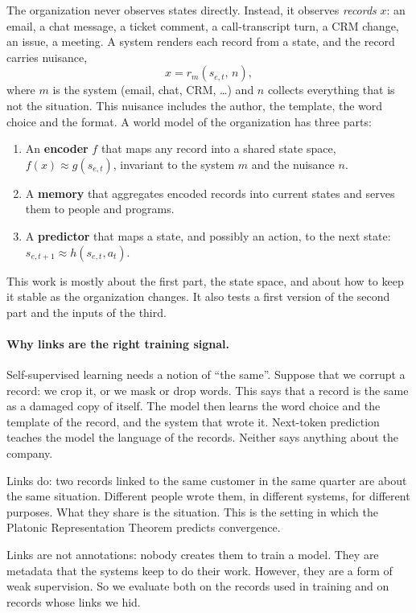 \documentclass[11pt]{article}
\begin{document}
The organization never observes states directly. Instead, it observes \emph{records} $x$: an email, a chat message, a ticket comment, a call-transcript turn, a CRM change, an issue, a meeting. A system renders each record from a state, and the record carries nuisance,
\begin{equation}
x = r_m\!\left(s_{e,t},\, n\right),
\end{equation}
where $m$ is the system (email, chat, CRM, \dots) and $n$ collects everything that is not the situation. This nuisance includes the author, the template, the word choice and the format. A world model of the organization has three parts:
\begin{enumerate}[label=(\roman*)]
\item An \textbf{encoder} $f$ that maps any record into a shared state space, $f(x) \approx g(s_{e,t})$, invariant to the system $m$ and the nuisance $n$.
\item A \textbf{memory} that aggregates encoded records into current states and serves them to people and programs.
\item A \textbf{predictor} that maps a state, and possibly an action, to the next state: $s_{e,t+1} \approx h(s_{e,t}, a_t)$.
\end{enumerate}
This work is mostly about the first part, the state space, and about how to keep it stable as the organization changes. It also tests a first version of the second part and the inputs of the third.

\paragraph{Why links are the right training signal.}
Self-supervised learning needs a notion of ``the same''. Suppose that we corrupt a record: we crop it, or we mask or drop words. This says that a record is the same as a damaged copy of itself. The model then learns the word choice and the template of the record, and the system that wrote it. Next-token prediction teaches the model the language of the records. Neither says anything about the company.

Links do: two records linked to the same customer in the same quarter are about the same situation. Different people wrote them, in different systems, for different purposes. What they share is the situation. This is the setting in which the Platonic Representation Theorem predicts convergence.

Links are not annotations: nobody creates them to train a model. They are metadata that the systems keep to do their work. However, they are a form of weak supervision. So we evaluate both on the records used in training and on records whose links we hid.
\end{document}
